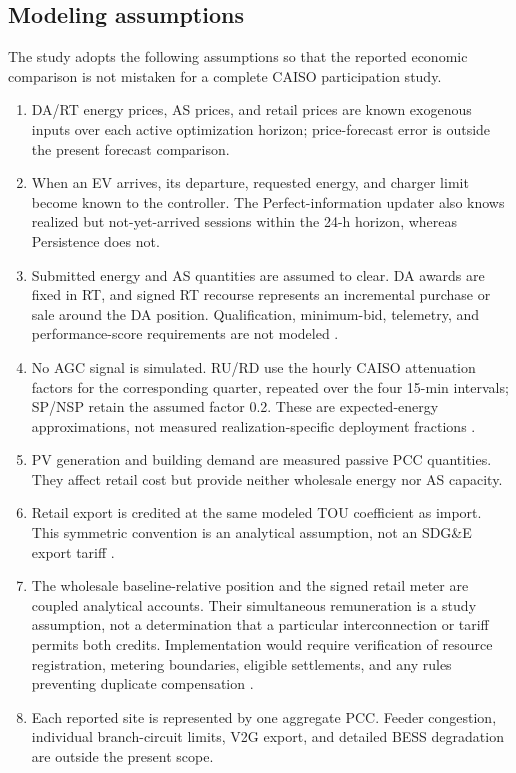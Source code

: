\documentclass[final,5p,times]{elsarticle}
\begin{document}
\subsection{Modeling assumptions}
The study adopts the following assumptions so that the reported economic
comparison is not mistaken for a complete CAISO participation study.
\begin{enumerate}
  \item DA/RT energy prices, AS prices, and retail prices are known exogenous
  inputs over each active optimization horizon; price-forecast error is outside
  the present forecast comparison.
  \item When an EV arrives, its departure, requested energy, and charger limit
  become known to the controller. The Perfect-information updater also
  knows realized but not-yet-arrived sessions within the 24-h horizon, whereas
  Persistence does not.
  \item Submitted energy and AS quantities are assumed to clear. DA awards are
  fixed in RT, and signed RT recourse represents an incremental purchase or
  sale around the DA position. Qualification, minimum-bid, telemetry, and
  performance-score requirements are not modeled \cite{caisoAncillary2026} \cite{caisoDER2026}.
  \item No AGC signal is simulated. RU/RD use the hourly CAISO attenuation
  factors for the corresponding quarter, repeated over the four 15-min intervals;
  SP/NSP retain the assumed factor 0.2. These are expected-energy approximations,
  not measured realization-specific deployment fractions \cite{caisoAttenuation2025}.
  \item PV generation and building demand are measured passive PCC quantities.
  They affect retail cost but provide neither wholesale energy nor AS capacity.
  \item Retail export is credited at the same modeled TOU coefficient as import.
  This symmetric convention is an analytical assumption, not an SDG\&E export
  tariff \cite{sdgeLargeCommercial2025}.
  \item The wholesale baseline-relative position and the signed retail meter
  are coupled analytical accounts. Their simultaneous remuneration is a study
  assumption, not a determination that a particular interconnection or tariff
  permits both credits. Implementation would require verification of resource
  registration, metering boundaries, eligible settlements, and any rules
  preventing duplicate compensation \cite{caisoDER2026}.
  \item Each reported site is represented by one aggregate PCC. Feeder congestion,
  individual branch-circuit limits, V2G export, and detailed BESS degradation are
  outside the present scope.
\end{enumerate}
\end{document}
